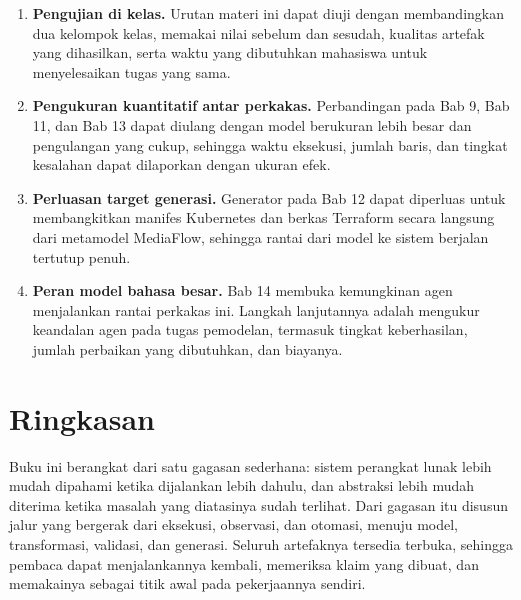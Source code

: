 \begin{enumerate}
  \item \textbf{Pengujian di kelas.} Urutan materi ini dapat diuji dengan
        membandingkan dua kelompok kelas, memakai nilai sebelum dan sesudah,
        kualitas artefak yang dihasilkan, serta waktu yang dibutuhkan mahasiswa
        untuk menyelesaikan tugas yang sama.
  \item \textbf{Pengukuran kuantitatif antar perkakas.} Perbandingan pada Bab 9,
        Bab 11, dan Bab 13 dapat diulang dengan model berukuran lebih besar dan
        pengulangan yang cukup, sehingga waktu eksekusi, jumlah baris, dan
        tingkat kesalahan dapat dilaporkan dengan ukuran efek.
  \item \textbf{Perluasan target generasi.} Generator pada Bab 12 dapat
        diperluas untuk membangkitkan manifes Kubernetes dan berkas Terraform
        secara langsung dari metamodel MediaFlow, sehingga rantai dari model ke
        sistem berjalan tertutup penuh.
  \item \textbf{Peran model bahasa besar.} Bab 14 membuka kemungkinan agen
        menjalankan rantai perkakas ini. Langkah lanjutannya adalah mengukur
        keandalan agen pada tugas pemodelan, termasuk tingkat keberhasilan,
        jumlah perbaikan yang dibutuhkan, dan biayanya.
\end{enumerate}

\section*{Ringkasan}

Buku ini berangkat dari satu gagasan sederhana: sistem perangkat lunak lebih
mudah dipahami ketika dijalankan lebih dahulu, dan abstraksi lebih mudah diterima
ketika masalah yang diatasinya sudah terlihat. Dari gagasan itu disusun jalur
yang bergerak dari eksekusi, observasi, dan otomasi, menuju model, transformasi,
validasi, dan generasi. Seluruh artefaknya tersedia terbuka, sehingga pembaca
dapat menjalankannya kembali, memeriksa klaim yang dibuat, dan memakainya sebagai
titik awal pada pekerjaannya sendiri.
